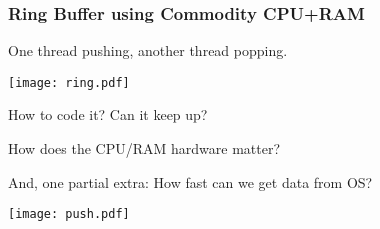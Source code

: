 \documentclass[xcolor=dvipsnames]{beamer}
\begin{document}

%

\begin{frame}[fragile]
  \frametitle{Ring Buffer using Commodity CPU+RAM}

  \begin{center}
    One thread pushing, another thread popping.

    \texttt{[image: ring.pdf]}

    How to code it? Can it keep up?

    How does the CPU/RAM hardware matter?

    \vfill

    And, one partial extra: How fast can we get data from OS?
    
    \texttt{[image: push.pdf]}
  \end{center}
  


\end{frame}
\end{document}
